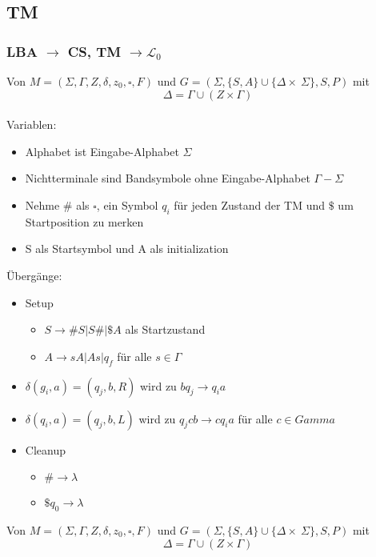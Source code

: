 \documentclass[9pt, a4paper]{article}
\begin{document}
\subsection{TM}
\subsubsection{LBA $\to$ CS, TM $\to \mathcal{L}_0$}
Von $M = (\Sigma, \Gamma, Z, \delta, z_0, \square, F)$ und $G= (\Sigma, \{S, A\} \cup \{\Delta \times\ \Sigma\}, S, P)$ mit
$$\Delta = \Gamma \cup (Z \times \Gamma)$$ \\
Variablen:
\begin{itemize}
    \item Alphabet ist Eingabe-Alphabet $\Sigma$
    \item Nichtterminale sind Bandsymbole ohne Eingabe-Alphabet $\Gamma-\Sigma$ 
    \item Nehme $\#$ als $\square$, ein Symbol $q_i$ für jeden Zustand der TM und $\$$ um Startposition zu merken
    \item S als Startsymbol und A als initialization
\end{itemize}
Übergänge:
\begin{itemize}
    \item Setup
        \begin{itemize}
            \item $S \to \#S|S\#|\$A$ als Startzustand
            \item $A \to sA|As|q_f$ für alle $s \in \Gamma$
        \end{itemize}
    \item $\delta(g_i, a) = (q_j, b, R)$ wird zu $bq_j \to q_ia$
    \item $\delta(q_i, a) = (q_j, b, L)$ wird zu $q_jcb \to cq_ia$ für alle $c\in Gamma$
    \item Cleanup
        \begin{itemize}
            \item $\# \to \lambda$
            \item $\$q_0 \to \lambda$
        \end{itemize}
\end{itemize}

Von $M = (\Sigma, \Gamma, Z, \delta, z_0, \square, F)$ und $G= (\Sigma, \{S, A\} \cup \{\Delta \times\ \Sigma\}, S, P)$ mit
$$\Delta = \Gamma \cup (Z \times \Gamma)$$
\end{document}
